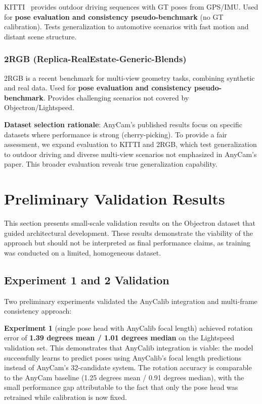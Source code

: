 KITTI~\parencite{geiger2013kitti} provides outdoor driving sequences with GT poses from GPS/IMU. Used for \textbf{pose evaluation and consistency pseudo-benchmark} (no GT calibration). Tests generalization to automotive scenarios with fast motion and distant scene structure.

\subsubsection{2RGB (Replica-RealEstate-Generic-Blends)}

2RGB is a recent benchmark for multi-view geometry tasks, combining synthetic and real data. Used for \textbf{pose evaluation and consistency pseudo-benchmark}. Provides challenging scenarios not covered by Objectron/Lightspeed.

\textbf{Dataset selection rationale}: AnyCam's published results focus on specific datasets where performance is strong (cherry-picking). To provide a fair assessment, we expand evaluation to KITTI and 2RGB, which test generalization to outdoor driving and diverse multi-view scenarios not emphasized in AnyCam's paper. This broader evaluation reveals true generalization capability.

\section{Preliminary Validation Results}\label{sec:preliminary-results}

This section presents small-scale validation results on the Objectron dataset that guided architectural development. These results demonstrate the viability of the approach but should not be interpreted as final performance claims, as training was conducted on a limited, homogeneous dataset.

\subsection{Experiment 1 and 2 Validation}\label{sec:exp-1-2-validation}

Two preliminary experiments validated the AnyCalib integration and multi-frame consistency approach:

\textbf{Experiment 1} (single pose head with AnyCalib focal length) achieved rotation error of \textbf{1.39 degrees mean / 1.01 degrees median} on the Lightspeed validation set. This demonstrates that AnyCalib integration is viable: the model successfully learns to predict poses using AnyCalib's focal length predictions instead of AnyCam's 32-candidate system. The rotation accuracy is comparable to the AnyCam baseline (1.25 degrees mean / 0.91 degrees median), with the small performance gap attributable to the fact that only the pose head was retrained while calibration is now fixed.

